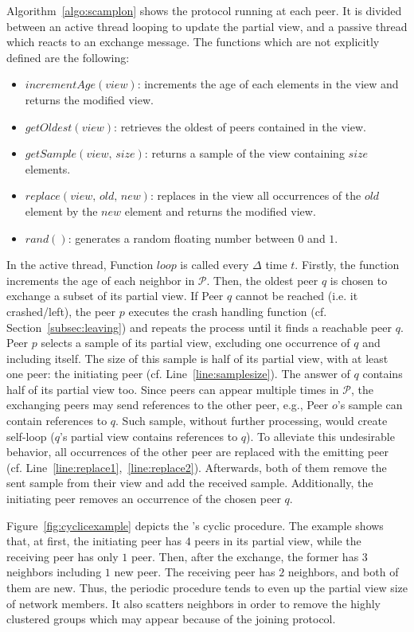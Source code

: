 Algorithm~\ref{algo:scamplon} shows the \SCAMPLON{} protocol running at each
peer. It is divided between an active thread looping to update the partial
view, and a passive thread which reacts to an exchange message. The functions
which are not explicitly defined are the following:
\begin{itemize}
\item $incrementAge(view)$: increments the age of each elements in the view
  and returns the modified view.
\item $getOldest(view)$: retrieves the oldest of peers contained in the view.
\item $getSample(view, \, size)$: returns a sample of the view containing
  $size$ elements.
\item $replace(view,\,old,\,new)$: replaces in the view all occurrences of
  the $old$ element by the $new$ element and returns the modified view.
\item $rand()$: generates a random floating number between $0$ and $1$.
\end{itemize}
In the active thread, Function $loop$ is called every $\Delta$ time
$t$. Firstly, the function increments the age of each neighbor in
$\mathcal{P}$. Then, the oldest peer $q$ is chosen to exchange a subset of its
partial view. If Peer $q$ cannot be reached (i.e. it crashed/left), the peer
$p$ executes the crash handling function (cf. Section~\ref{subsec:leaving}) and
repeats the process until it finds a reachable peer $q$. Peer $p$ selects a
sample of its partial view, excluding one occurrence of $q$ and including
itself. The size of this sample is half of its partial view, with at least one
peer: the initiating peer (cf. Line~\ref{line:samplesize}). The answer of $q$
contains half of its partial view too. Since peers can appear multiple times in
$\mathcal{P}$, the exchanging peers may send references to the other peer,
e.g., Peer $o$'s sample can contain references to $q$. Such sample, without
further processing, would create self-loop ($q$'s partial view contains
references to $q$). To alleviate this undesirable behavior, all occurrences of
the other peer are replaced with the emitting peer
(cf. Line~\ref{line:replace1},~\ref{line:replace2}).  Afterwards, both of
them remove the sent sample from their view and add the received
sample. Additionally, the initiating peer removes an occurrence of the chosen
peer $q$.



Figure~\ref{fig:cyclicexample} depicts the \SCAMPLON{}'s cyclic procedure. The
example shows that, at first, the initiating peer has $4$ peers in its partial
view, while the receiving peer has only $1$ peer. Then, after the exchange, the
former has $3$ neighbors including $1$ new peer. The receiving peer has $2$
neighbors, and both of them are new. Thus, the periodic procedure tends to
even up the partial view size of network members. It also scatters neighbors in
order to remove the highly clustered groups which may appear because of the
joining protocol.


